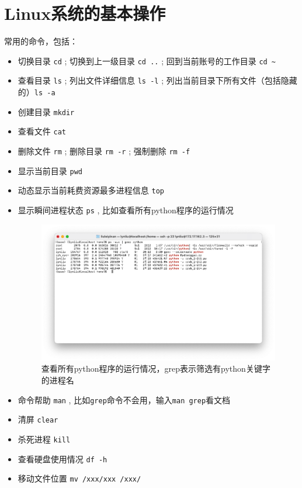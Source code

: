 \documentclass{article}
\begin{document}
\section{Linux系统的基本操作}
常用的命令，包括：
\begin{itemize}
    \item 切换目录 \verb|cd| ; 切换到上一级目录 \verb|cd ..| ; 回到当前账号的工作目录 \verb|cd ~|
    \item 查看目录 \verb|ls| ; 列出文件详细信息 \verb|ls -l| ; 列出当前目录下所有文件（包括隐藏的）\verb|ls -a|
    \item 创建目录 \verb|mkdir|
    \item 查看文件 \verb|cat|
    \item 删除文件 \verb|rm| ; 删除目录 \verb|rm -r| ; 强制删除 \verb|rm -f|
    \item 显示当前目录 \verb|pwd|
    \item 动态显示当前耗费资源最多进程信息 \verb|top|
    \item 显示瞬间进程状态 \verb|ps| , 比如查看所有python程序的运行情况
    \begin{figure}[H]
        \centering
        \includegraphics[scale = 0.3]{figs/3.png}
        \caption{查看所有python程序的运行情况，grep表示筛选有python关键字的进程名}
    \end{figure}
    \item 命令帮助 \verb|man| , 比如\verb|grep|命令不会用，输入\verb|man grep|看文档
    \item 清屏 \verb|clear|
    \item 杀死进程 \verb|kill|
    \item 查看硬盘使用情况 \verb|df -h|
    \item 移动文件位置 \verb|mv /xxx/xxx /xxx/|
\end{itemize}
\end{document}
